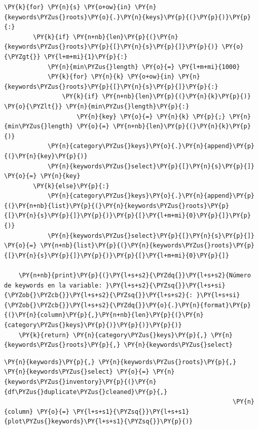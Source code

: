 \begin{tcolorbox}[breakable, size=fbox, boxrule=1pt, pad at break*=1mm,colback=cellbackground, colframe=cellborder]
\begin{Verbatim}[commandchars=\\\{\}]
    \PY{k}{for} \PY{n}{s} \PY{o+ow}{in} \PY{n}{keywords\PYZus{}roots}\PY{o}{.}\PY{n}{keys}\PY{p}{(}\PY{p}{)}\PY{p}{:}
        \PY{k}{if} \PY{n+nb}{len}\PY{p}{(}\PY{n}{keywords\PYZus{}roots}\PY{p}{[}\PY{n}{s}\PY{p}{]}\PY{p}{)} \PY{o}{\PYZgt{}} \PY{l+m+mi}{1}\PY{p}{:}  
            \PY{n}{min\PYZus{}length} \PY{o}{=} \PY{l+m+mi}{1000}
            \PY{k}{for} \PY{n}{k} \PY{o+ow}{in} \PY{n}{keywords\PYZus{}roots}\PY{p}{[}\PY{n}{s}\PY{p}{]}\PY{p}{:}
                \PY{k}{if} \PY{n+nb}{len}\PY{p}{(}\PY{n}{k}\PY{p}{)} \PY{o}{\PYZlt{}} \PY{n}{min\PYZus{}length}\PY{p}{:}
                    \PY{n}{key} \PY{o}{=} \PY{n}{k} \PY{p}{;} \PY{n}{min\PYZus{}length} \PY{o}{=} \PY{n+nb}{len}\PY{p}{(}\PY{n}{k}\PY{p}{)}            
            \PY{n}{category\PYZus{}keys}\PY{o}{.}\PY{n}{append}\PY{p}{(}\PY{n}{key}\PY{p}{)}
            \PY{n}{keywords\PYZus{}select}\PY{p}{[}\PY{n}{s}\PY{p}{]} \PY{o}{=} \PY{n}{key}
        \PY{k}{else}\PY{p}{:}
            \PY{n}{category\PYZus{}keys}\PY{o}{.}\PY{n}{append}\PY{p}{(}\PY{n+nb}{list}\PY{p}{(}\PY{n}{keywords\PYZus{}roots}\PY{p}{[}\PY{n}{s}\PY{p}{]}\PY{p}{)}\PY{p}{[}\PY{l+m+mi}{0}\PY{p}{]}\PY{p}{)}
            \PY{n}{keywords\PYZus{}select}\PY{p}{[}\PY{n}{s}\PY{p}{]} \PY{o}{=} \PY{n+nb}{list}\PY{p}{(}\PY{n}{keywords\PYZus{}roots}\PY{p}{[}\PY{n}{s}\PY{p}{]}\PY{p}{)}\PY{p}{[}\PY{l+m+mi}{0}\PY{p}{]}
                   
    \PY{n+nb}{print}\PY{p}{(}\PY{l+s+s2}{\PYZdq{}}\PY{l+s+s2}{Número de keywords en la variable: }\PY{l+s+s2}{\PYZsq{}}\PY{l+s+si}{\PYZob{}\PYZcb{}}\PY{l+s+s2}{\PYZsq{}}\PY{l+s+s2}{: }\PY{l+s+si}{\PYZob{}\PYZcb{}}\PY{l+s+s2}{\PYZdq{}}\PY{o}{.}\PY{n}{format}\PY{p}{(}\PY{n}{column}\PY{p}{,}\PY{n+nb}{len}\PY{p}{(}\PY{n}{category\PYZus{}keys}\PY{p}{)}\PY{p}{)}\PY{p}{)}
    \PY{k}{return} \PY{n}{category\PYZus{}keys}\PY{p}{,} \PY{n}{keywords\PYZus{}roots}\PY{p}{,} \PY{n}{keywords\PYZus{}select}
\end{Verbatim}
\end{tcolorbox}

    \begin{tcolorbox}[breakable, size=fbox, boxrule=1pt, pad at break*=1mm,colback=cellbackground, colframe=cellborder]
\begin{Verbatim}[commandchars=\\\{\}]
\PY{n}{keywords}\PY{p}{,} \PY{n}{keywords\PYZus{}roots}\PY{p}{,} \PY{n}{keywords\PYZus{}select} \PY{o}{=} \PY{n}{keywords\PYZus{}inventory}\PY{p}{(}\PY{n}{df\PYZus{}duplicate\PYZus{}cleaned}\PY{p}{,}
                                                               \PY{n}{column} \PY{o}{=} \PY{l+s+s1}{\PYZsq{}}\PY{l+s+s1}{plot\PYZus{}keywords}\PY{l+s+s1}{\PYZsq{}}\PY{p}{)}
\end{Verbatim}
\end{tcolorbox}

